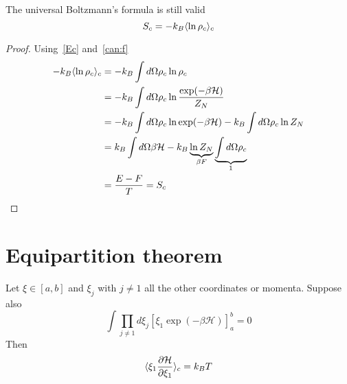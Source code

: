     The universal Boltzmann's formula is still valid
    \begin{equation*}
        S_c = -k_B \langle\ln \rho_c\rangle_{c} 
    \end{equation*}


    \begin{proof}
        Using~\eqref{Ec} and~\eqref{can:f}
        \begin{equation*}
            \begin{aligned}
            -k_B \langle\ln \rho_c\rangle_{c} & = -k_B \int d\Omega \rho_c \ln \rho_c \\ & = -k_B \int d\Omega \rho_c \ln \frac{\exp(-\beta \mathcal H)}{Z_N} \\ & = -k_B \int d\Omega \rho_c \ln \exp(-\beta \mathcal H) - k_B \int d\Omega \rho_c \ln Z_N \\ & = k_B \int d\Omega \beta \mathcal H - k_B \underbrace{\ln Z_N}_{\beta F} \underbrace{\int d\Omega \rho_c}_{1} \\ & =  \frac{E - F}{T} = S_c
        \end{aligned}
        \end{equation*}
    \end{proof}

\section{Equipartition theorem}

    \begin{theorem}
        Let $\xi \in [a,b]$ and $\xi_j$ with $j \neq 1$ all the other coordinates or momenta. Suppose also 
        \begin{equation}\label{cond}
            \int \prod_{j \neq 1} d \xi_j [\xi_1 \exp(-\beta \mathcal H)]_a^b = 0
        \end{equation}
        Then 
        \begin{equation}\label{equi}
            \langle\xi_1 \frac{\partial\mathcal H}{\partial\xi_1}\rangle_{c} = k_B T
        \end{equation}
    \end{theorem}

